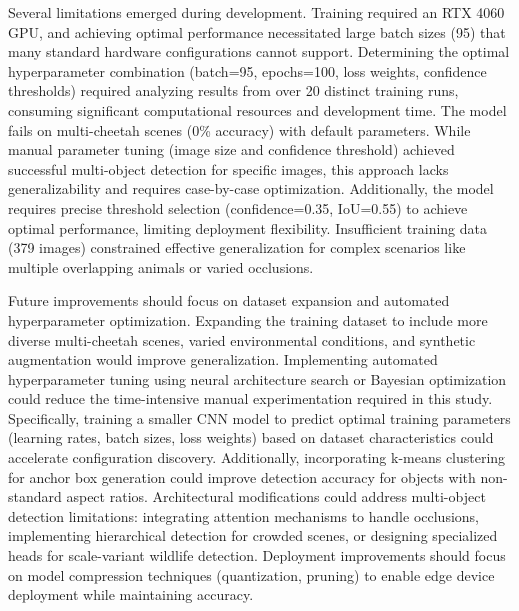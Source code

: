 \documentclass[conference]{IEEEtran}
\begin{document}
Several limitations emerged during development. Training required an RTX 4060 GPU, and achieving optimal performance necessitated large batch sizes (95) that many standard hardware configurations cannot support. Determining the optimal hyperparameter combination (batch=95, epochs=100, loss weights, confidence thresholds) required analyzing results from over 20 distinct training runs, consuming significant computational resources and development time. The model fails on multi-cheetah scenes (0\% accuracy) with default parameters. While manual parameter tuning (image size and confidence threshold) achieved successful multi-object detection for specific images, this approach lacks generalizability and requires case-by-case optimization. Additionally, the model requires precise threshold selection (confidence=0.35, IoU=0.55) to achieve optimal performance, limiting deployment flexibility. Insufficient training data (379 images) constrained effective generalization for complex scenarios like multiple overlapping animals or varied occlusions.

Future improvements should focus on dataset expansion and automated hyperparameter optimization. Expanding the training dataset to include more diverse multi-cheetah scenes, varied environmental conditions, and synthetic augmentation would improve generalization. Implementing automated hyperparameter tuning using neural architecture search or Bayesian optimization could reduce the time-intensive manual experimentation required in this study. Specifically, training a smaller CNN model to predict optimal training parameters (learning rates, batch sizes, loss weights) based on dataset characteristics could accelerate configuration discovery. Additionally, incorporating k-means clustering for anchor box generation could improve detection accuracy for objects with non-standard aspect ratios. Architectural modifications could address multi-object detection limitations: integrating attention mechanisms to handle occlusions, implementing hierarchical detection for crowded scenes, or designing specialized heads for scale-variant wildlife detection. Deployment improvements should focus on model compression techniques (quantization, pruning) to enable edge device deployment while maintaining accuracy.
\end{document}

